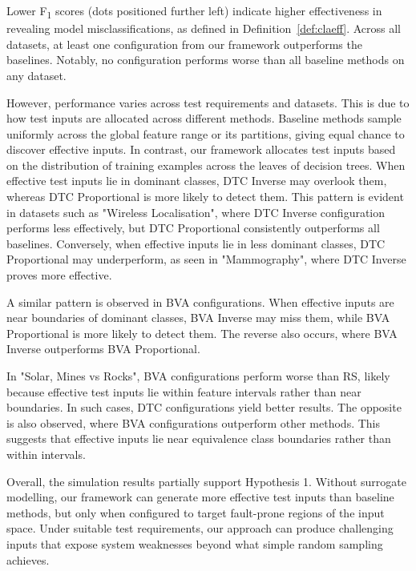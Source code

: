 \documentclass[
]{ceurart}
\theoremstyle{definition}
\begin{document}
Lower F\textsubscript{1} scores (dots positioned further left) indicate higher effectiveness in revealing model misclassifications, as defined in Definition~\ref{def:claeff}. Across all datasets, at least one configuration from our framework outperforms the baselines. Notably, no configuration performs worse than all baseline methods on any dataset.

However, performance varies across test requirements and datasets. This is due to how test inputs are allocated across different methods. Baseline methods sample uniformly across the global feature range or its partitions, giving equal chance to discover effective inputs. In contrast, our framework allocates test inputs based on the distribution of training examples across the leaves of decision trees. When effective test inputs lie in dominant classes, DTC Inverse may overlook them, whereas DTC Proportional is more likely to detect them. This pattern is evident in datasets such as "Wireless Localisation", where DTC Inverse configuration performs less effectively, but DTC Proportional consistently outperforms all baselines. Conversely, when effective inputs lie in less dominant classes, DTC Proportional may underperform, as seen in "Mammography", where DTC Inverse proves more effective.

A similar pattern is observed in BVA configurations. When effective inputs are near boundaries of dominant classes, BVA Inverse may miss them, while BVA Proportional is more likely to detect them. The reverse also occurs, where BVA Inverse outperforms BVA Proportional.

In "Solar, Mines vs Rocks", BVA configurations perform worse than RS, likely because effective test inputs lie within feature intervals rather than near boundaries. In such cases, DTC configurations yield better results. The opposite is also observed, where BVA configurations outperform other methods. This suggests that effective inputs lie near equivalence class boundaries rather than within intervals.

Overall, the simulation results partially support Hypothesis 1. Without surrogate modelling, our framework can generate more effective test inputs than baseline methods, but only when configured to target fault-prone regions of the input space. Under suitable test requirements, our approach can produce challenging inputs that expose system weaknesses beyond what simple random sampling achieves.
\end{document}
